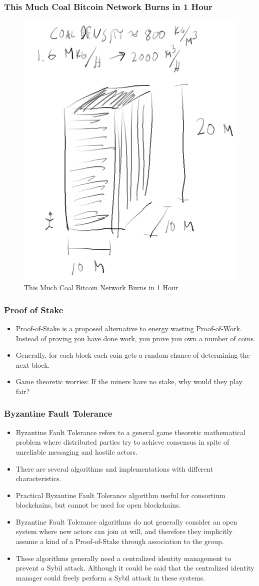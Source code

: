 \documentclass[8pt]{beamer}
\begin{document}
\begin{frame}
\frametitle{This Much Coal Bitcoin Network Burns in 1 Hour}

\begin{figure}[tb]
 \centering
 \includegraphics[width=5 cm,keepaspectratio=true]{./blockchain_images/coal.png}
 \caption{This Much Coal Bitcoin Network Burns in 1 Hour}
\end{figure}

\end{frame}

\begin{frame}
\frametitle{Proof of Stake}

\begin{itemize}
 \item Proof-of-Stake is a proposed alternative to energy wasting Proof-of-Work. Instead of proving you have done work, you prove you own a number of coins.
 \item Generally, for each block each coin gets a random chance of determining the next block.
 \item Game theoretic worries: If the miners have no stake, why would they play fair?
\end{itemize}

\end{frame}

\begin{frame}
\frametitle{Byzantine Fault Tolerance}
\begin{itemize}
 \item Byzantine Fault Tolerance refers to a general game theoretic mathematical problem where distributed parties try to achieve consensus in spite of unreliable messaging and hostile actors.
 \item There are several algorithms and implementations with different characteristics.
 \item Practical Byzantine Fault Tolerance algorithm useful for consortium blockchains, but cannot be used for open blockchains.
 \item Byzantine Fault Tolerance algorithms do not generally consider an open system where new actors can join at will, and therefore they implicitly assume a kind of a Proof-of-Stake through association to the group.
 \item These algorithms generally need a centralized identity management to prevent a Sybil attack. Although it could be said that the centralized identity manager could freely perform a Sybil attack in these systems.
\end{itemize}

\end{frame}
\end{document}

